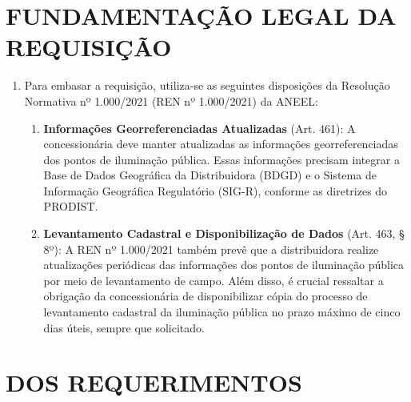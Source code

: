 \newcommand{\tipoRequerimento}{Solicitação de Relatórios de Censos}

\section{FUNDAMENTAÇÃO LEGAL DA REQUISIÇÃO}

\begin{enumerate}[resume]
\item
  Para embasar a requisição, utiliza-se as seguintes disposições da Resolução Normativa nº 1.000/2021 (REN nº 1.000/2021) da ANEEL:
  \begin{enumerate}
  \item
    \textbf{Informações Georreferenciadas Atualizadas} (Art. 461): A concessionária deve manter atualizadas as informações georreferenciadas dos pontos de iluminação pública. Essas informações precisam integrar a Base de Dados Geográfica da Distribuidora (BDGD) e o Sistema de Informação Geográfica Regulatório (SIG-R), conforme as diretrizes do PRODIST.
  \item 
  \textbf{Levantamento Cadastral e Disponibilização de Dados} (Art. 463, § 8º): A REN nº 1.000/2021 também prevê que a distribuidora realize atualizações periódicas das informações dos pontos de iluminação pública por meio de levantamento de campo. Além disso, é crucial ressaltar a obrigação da concessionária de disponibilizar cópia do processo de levantamento cadastral da iluminação pública no prazo máximo de cinco dias úteis, sempre que solicitado.
  \end{enumerate}
\end{enumerate}

\section{DOS REQUERIMENTOS}

